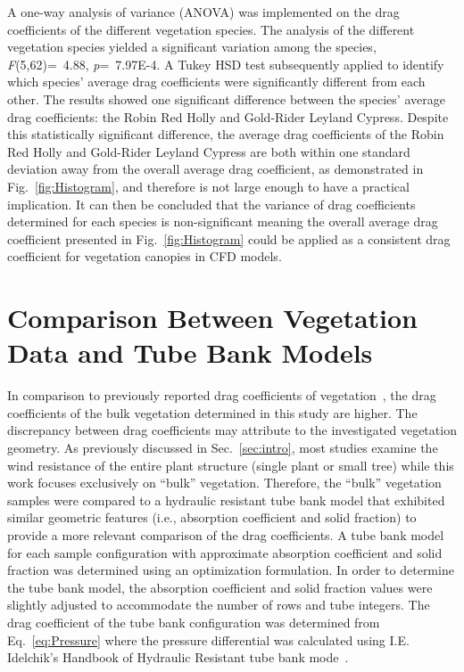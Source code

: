 \documentclass[12pt]{article}
\begin{document}
A one-way analysis of variance (ANOVA) was implemented on the drag coefficients of the different vegetation species. The analysis of the different vegetation species yielded a significant variation among the species, \textit{F}(5,62)=~4.88, \textit{p}=~7.97E-4. A Tukey HSD test subsequently applied to identify which species' average drag coefficients were significantly different from each other. The results showed one significant difference between the species' average drag coefficients: the Robin Red Holly and Gold-Rider Leyland Cypress. Despite this statistically significant difference, the average drag coefficients of the Robin Red Holly and Gold-Rider Leyland Cypress are both within one standard deviation away from the overall average drag coefficient, as demonstrated in Fig.~\ref{fig:Histogram},  and therefore is not large enough to have a practical implication. It can then be concluded that the variance of drag coefficients determined for each species is non-significant meaning the overall average drag coefficient presented in Fig.~\ref{fig:Histogram} could be applied as a consistent drag coefficient for vegetation canopies in CFD models.

\section{Comparison Between Vegetation Data and Tube Bank Models}
\label{sec:comp}

In comparison to previously reported drag coefficients of vegetation~\cite{Cao2012,Jalonen2014,Mayhead1973,Gillies2002,Ishikawa2006}, the drag coefficients of the bulk vegetation determined in this study are higher. The discrepancy between drag coefficients may attribute to the investigated vegetation geometry. As previously discussed in Sec.~\ref{sec:intro}, most studies examine the wind resistance of the entire plant structure (single plant or small tree) while this work focuses exclusively on ``bulk'' vegetation. Therefore, the ``bulk'' vegetation samples were compared to a hydraulic resistant tube bank model that exhibited similar geometric features (i.e., absorption coefficient and solid fraction) to provide a more relevant comparison of the drag coefficients. A tube bank model for each sample configuration with approximate absorption coefficient and solid fraction was determined using an optimization formulation. In order to determine the tube bank model, the absorption coefficient and solid fraction values were slightly adjusted to accommodate the number of rows and tube integers. The drag coefficient of the tube bank configuration was determined from Eq.~\ref{eq:Pressure} where the pressure differential was calculated using I.E. Idelchik's Handbook of Hydraulic Resistant tube bank mode~\cite{Idelchick1994}.
\end{document}
